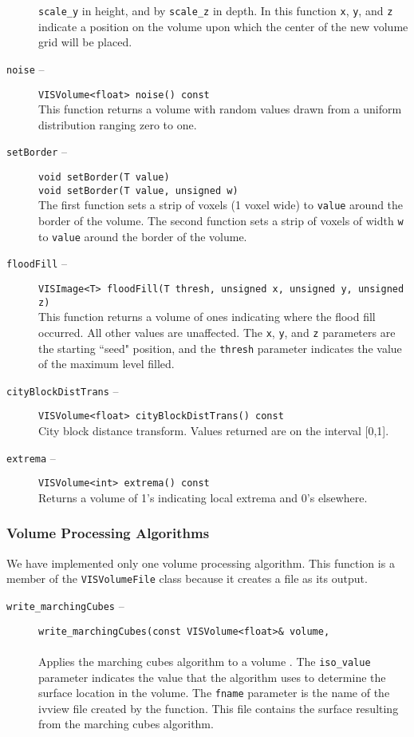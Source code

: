 \begin{description}
{\tt scale\_y} in height, and by {\tt scale\_z} in depth.
In this function {\tt x}, {\tt y}, and {\tt z} indicate
a position on the volume upon which the center of the new volume grid
will be placed.
\item[{\tt noise} --]
{\tt VISVolume<float> noise() const}\\
This function returns a volume with random values drawn from a uniform 
distribution ranging zero to one.
\item[{\tt setBorder} --]
{\tt void setBorder(T value)}\\
{\tt void setBorder(T value, unsigned w)}\\
The first function sets a strip of voxels (1 voxel wide) to {\tt value} around the
border of the volume.
The second function sets a strip of voxels of width {\tt w} to {\tt value} around the
border of the volume.
\item[{\tt floodFill} --]
{\tt VISImage<T> floodFill(T thresh, unsigned x, unsigned y, unsigned z)}\\
This function returns a volume of ones indicating where the flood fill
occurred.  All other values are unaffected.  The {\tt x}, {\tt y}, and {\tt z} parameters
are the starting ``seed" position, and the {\tt thresh} parameter indicates
the value of the maximum level filled.
\item[{\tt cityBlockDistTrans} --]
{\tt VISVolume<float> cityBlockDistTrans() const}\\
City block distance transform.  Values returned are on the interval [0,1].
\item[{\tt extrema} --]
{\tt VISVolume<int> extrema() const}\\
Returns a volume of 1's indicating local extrema and 0's elsewhere.
\end{description}

\subsubsection{Volume Processing Algorithms}
\label{vl_vpa}
We have implemented only one volume processing algorithm.
This function is a member of the {\tt VISVolumeFile} class
because it creates a file as its output.
\begin{description}
\item[{\tt write\_marchingCubes} --]
{\tt write\_marchingCubes(const VISVolume<float>\& volume,}\\
\hspace*{0.25in}{\tt float iso\_value, char* fname) const}\\
Applies the marching cubes algorithm to a volume \cite{Lorenson82}.
The {\tt iso\_value} parameter indicates the value that the algorithm
uses to determine the surface location in the volume.
The {\tt fname} parameter is the name of the ivview file
created by the function.  This file contains the surface
resulting from the marching cubes algorithm.
\end{description}

